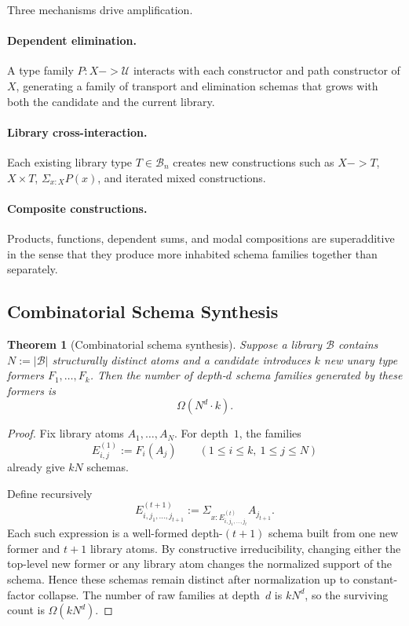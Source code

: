 \documentclass[11pt,a4paper]{article}
\def\to{->}%
\theoremstyle{plain}
\newtheorem{theorem}{Theorem}[section]
\theoremstyle{definition}
\theoremstyle{remark}
\newcommand{\U}{\mathcal{U}}
\newcommand{\B}{\mathcal{B}}
\begin{document}
Three mechanisms drive amplification.

\paragraph{Dependent elimination.}
A type family $P:X\to \U$ interacts with each constructor and path constructor of $X$, generating a family of transport and elimination schemas that grows with both the candidate and the current library.

\paragraph{Library cross-interaction.}
Each existing library type $T\in \B_n$ creates new constructions such as $X\to T$, $X\times T$, $\Sigma_{x:X}P(x)$, and iterated mixed constructions.

\paragraph{Composite constructions.}
Products, functions, dependent sums, and modal compositions are superadditive in the sense that they produce more inhabited schema families together than separately.

\subsection{Combinatorial Schema Synthesis}

\begin{theorem}[Combinatorial schema synthesis]
\label{thm:schemas}
Suppose a library $\B$ contains $N:=|\B|$ structurally distinct atoms and a candidate introduces $k$ new unary type formers $F_1,\dots,F_k$.  Then the number of depth-$d$ schema families generated by these formers is
\[
  \Omega(N^d\cdot k).
\]
\end{theorem}

\begin{proof}
Fix library atoms $A_1,\dots,A_N$.  For depth~$1$, the families
\[
  E^{(1)}_{i,j}:=F_i(A_j)
  \qquad
  (1\le i\le k,\ 1\le j\le N)
\]
already give $kN$ schemas.

Define recursively
\[
  E^{(t+1)}_{i,j_1,\dots,j_{t+1}}
  :=
  \Sigma_{x:E^{(t)}_{i,j_1,\dots,j_t}} A_{j_{t+1}}.
\]
Each such expression is a well-formed depth-$(t+1)$ schema built from one new former and $t+1$ library atoms.  By constructive irreducibility, changing either the top-level new former or any library atom changes the normalized support of the schema.  Hence these schemas remain distinct after normalization up to constant-factor collapse.  The number of raw families at depth~$d$ is $kN^d$, so the surviving count is $\Omega(kN^d)$.
\end{proof}
\end{document}

